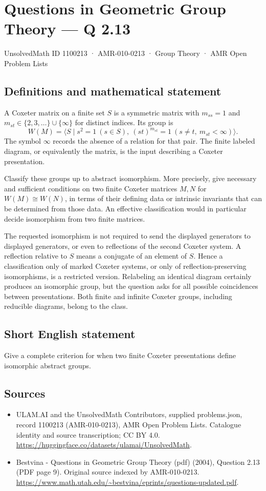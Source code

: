 \documentclass[11pt,a4paper]{article}
\begin{document}
\section*{Questions in Geometric Group Theory — Q 2.13}\label{1100213}
{\small UnsolvedMath ID 1100213 · AMR-010-0213 · Group Theory · AMR Open Problem Lists}
\subsection{Definitions and mathematical statement}
A Coxeter matrix on a finite set $S$ is a symmetric matrix with $m_{ss}=1$ and $m_{st}\in\{2,3,\ldots\}\cup\{\infty\}$ for distinct indices. Its group is
\[
 W(M)=\langle S\mid s^2=1\ (s\in S),\ (st)^{m_{st}}=1
                  \ (s\ne t,\ m_{st}<\infty)\rangle.
\]
The symbol $\infty$ records the absence of a relation for that pair. The finite labeled diagram, or equivalently the matrix, is the input describing a Coxeter presentation.

Classify these groups up to abstract isomorphism. More precisely, give necessary and sufficient conditions on two finite Coxeter matrices $M,N$ for $W(M)\cong W(N)$, in terms of their defining data or intrinsic invariants that can be determined from those data. An effective classification would in particular decide isomorphism from two finite matrices.

The requested isomorphism is not required to send the displayed generators to displayed generators, or even to reflections of the second Coxeter system. A reflection relative to $S$ means a conjugate of an element of $S$. Hence a classification only of marked Coxeter systems, or only of reflection-preserving isomorphisms, is a restricted version. Relabeling an identical diagram certainly produces an isomorphic group, but the question asks for all possible coincidences between presentations. Both finite and infinite Coxeter groups, including reducible diagrams, belong to the class.
\subsection{Short English statement}
Give a complete criterion for when two finite Coxeter presentations define isomorphic abstract groups.
\subsection{Sources}
\begin{itemize}
\item[S1] ULAM.AI and the UnsolvedMath Contributors, supplied problems.json, record 1100213 (AMR-010-0213), AMR Open Problem Lists. Catalogue identity and source transcription; CC BY 4.0.
\url{https://huggingface.co/datasets/ulamai/UnsolvedMath}.
\item[S2] Bestvina - Questions in Geometric Group Theory (pdf) (2004), Question 2.13 (PDF page 9). Original source indexed by AMR-010-0213.
\url{https://www.math.utah.edu/~bestvina/eprints/questions-updated.pdf}.
\end{itemize}
\end{document}
